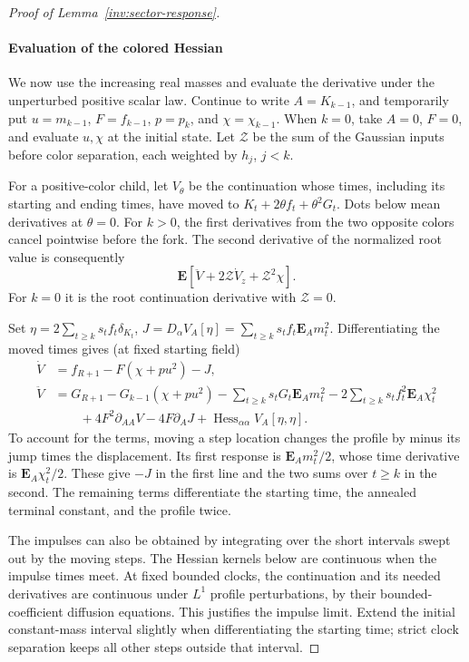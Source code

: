 \begin{proof}[Proof of Lemma~\ref{inv:sector-response}]
\paragraph{Evaluation of the colored Hessian}
We now use the increasing real masses and evaluate the derivative under
the unperturbed positive scalar law. Continue to write
\(A=K_{k-1}\), and temporarily put \(u=m_{k-1}\),
\(F=f_{k-1}\), \(p=p_k\), and \(\chi=\chi_{k-1}\).
When \(k=0\), take \(A=0\), \(F=0\), and evaluate \(u,\chi\) at
the initial state. Let \(\mathcal Z\) be the sum of the Gaussian inputs before
color separation, each weighted by \(h_j\), \(j<k\).

For a positive-color child, let \(V_\theta\) be the continuation whose
times, including its starting and ending times, have moved to
\(K_t+2\theta f_t+\theta^2G_t\). Dots below mean derivatives at
\(\theta=0\). For \(k>0\), the first derivatives from the two
opposite colors cancel pointwise before the fork. The second derivative
of the normalized root value is consequently
\[
 \mathbf E[\ddot V+2\mathcal Z\dot V_z+\mathcal Z^2\chi] .
\]
For \(k=0\) it is the root continuation derivative with \(\mathcal Z=0\).

Set \(\eta=2\sum_{t\ge k}s_tf_t\delta_{K_t}\), \(J=D_\alpha V_A[\eta]=\sum_{t\ge k}s_tf_t\mathbf E_A m_t^2\). Differentiating the moved times gives (at fixed starting field)
\[
\begin{split}
 \dot V&= f_{R+1}-F(\chi+p u^2)-J,\\
 \ddot V&=G_{R+1}-G_{k-1}(\chi+p u^2)-\sum_{t\ge k}s_t G_t\mathbf E_A m_t^2
         -2\sum_{t\ge k}s_t f_t^2\mathbf E_A\chi_t^2\\
      &\qquad+4F^2\partial_{AA} V-4F\partial_A J+
                       \operatorname{Hess}_{\alpha\alpha}V_A[\eta,\eta].
\end{split}
\]
To account for the terms, moving a step location changes the profile by
minus its jump times the displacement. Its first response is
\(\mathbf E_A m_t^2/2\), whose time derivative is
\(\mathbf E_A\chi_t^2/2\). These give \(-J\) in the first line and
the two sums over \(t\ge k\) in the second. The remaining terms
differentiate the starting time, the annealed terminal constant, and
the profile twice.

The impulses can also be obtained by integrating over the short
intervals swept out by the moving steps. The Hessian kernels below are
continuous when the impulse times meet. At fixed bounded clocks, the
continuation and its needed derivatives are continuous under
\(L^1\) profile perturbations, by their bounded-coefficient diffusion
equations. This justifies the impulse limit. Extend the initial
constant-mass interval slightly when differentiating the starting time;
strict clock separation keeps all other steps outside that interval.


\end{proof}
